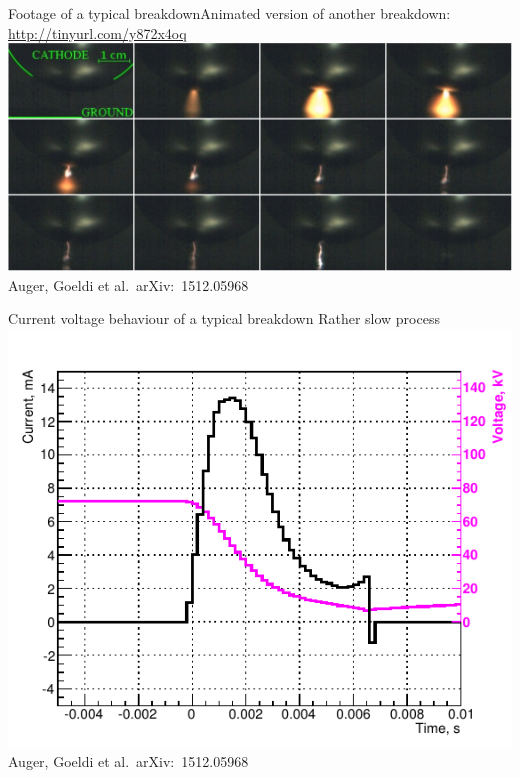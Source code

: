 \documentclass[]{beamer}
\newcommand*{\emphcol}{blue}
\begin{document}
\begin{frame}{Footage of a typical breakdown}{Animated version of another breakdown: \url{http://tinyurl.com/y872x4oq}}
	\centering
	\includegraphics[width=\textwidth]{hv/montage}\\
	{\tiny Auger, Goeldi et al.\ arXiv:~1512.05968~\cite{breakdown_16}}\\
\end{frame}

\begin{frame}{Current voltage behaviour of a typical breakdown}{\color{\emphcol} Rather slow process}
	\centering
	\includegraphics[height=.75\textheight]{hv/IVcorr}\\
	{\tiny Auger, Goeldi et al.\ arXiv:~1512.05968~\cite{breakdown_16}}\\
\end{frame}
\end{document}
